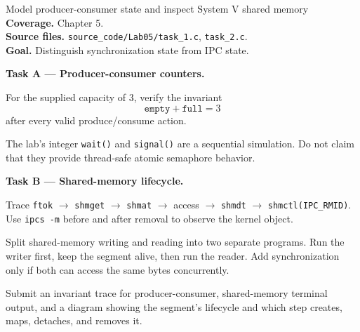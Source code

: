 \begin{labproject}{Model producer-consumer state and inspect System V shared memory}
\textbf{Coverage.} Chapter 5.\\
\textbf{Source files.} \texttt{source\_code/Lab05/task\_1.c}, \texttt{task\_2.c}.\\
\textbf{Goal.} Distinguish synchronization state from IPC state.

\medskip\noindent\textbf{Task A --- Producer-consumer counters.}\par
For the supplied capacity of 3, verify the invariant
\[
\texttt{empty} + \texttt{full} = 3
\]
after every valid produce/consume action.

\begin{pitfall}
The lab's integer \texttt{wait()} and \texttt{signal()} are a sequential simulation. Do not claim that they provide thread-safe atomic semaphore behavior.
\end{pitfall}

\medskip\noindent\textbf{Task B --- Shared-memory lifecycle.}\par
Trace \texttt{ftok} $\rightarrow$ \texttt{shmget} $\rightarrow$ \texttt{shmat} $\rightarrow$ access $\rightarrow$ \texttt{shmdt} $\rightarrow$ \texttt{shmctl(IPC\_RMID)}. Use \texttt{ipcs -m} before and after removal to observe the kernel object.

\begin{tryit}
Split shared-memory writing and reading into two separate programs. Run the writer first, keep the segment alive, then run the reader. Add synchronization only if both can access the same bytes concurrently.
\end{tryit}
\end{labproject}

\begin{labdeliverable}
Submit an invariant trace for producer-consumer, shared-memory terminal output, and a diagram showing the segment's lifecycle and which step creates, maps, detaches, and removes it.
\end{labdeliverable}
